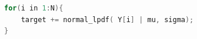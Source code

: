\begin{lstlisting}[language=C++,label={stan::26_02},caption={target記法}]
for(i in 1:N){
    target += normal_lpdf( Y[i] | mu, sigma);
}
\end{lstlisting}
